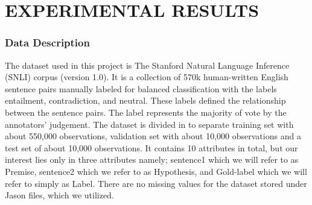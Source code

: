 \documentclass[runningheads]{llncs}
\begin{document}
\section{EXPERIMENTAL RESULTS}
\subsubsection{Data Description}
The dataset used in this project is The Stanford Natural Language Inference (SNLI) corpus (version 1.0). It is a collection of 570k human-written English sentence pairs manually labeled for balanced classification with the labels entailment, contradiction, and neutral. These labels defined the relationship between the sentence pairs. The label represents the majority of vote by the annotators’ judgement. The dataset is divided in to separate training set with about 550,000 observations, validation set with about 10,000 observations and a test set of about 10,000 observations. It contains 10 attributes in total, but our interest lies only in three attributes namely; sentence1 which we will refer to as Premise, sentence2 which we refer to as Hypothesis, and Gold-label which we will refer to simply as Label. There are no missing values for the dataset stored under Jason files, which we utilized.\\   
	\\
\end{document}
